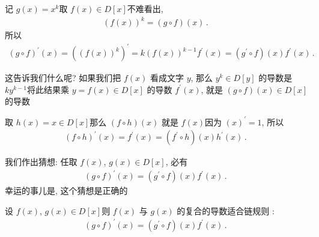 记 $g(x) = x^k$\period 取 $f(x) \in D[x]$\period 不难看出,
\begin{align*}
    (f(x))^k = (g \circ f)(x) \period
\end{align*}
所以
\begin{align*}
    (g \circ f)^{\prime}(x) = ((f(x))^k)^{\prime} = k(f(x))^{k-1} f^{\prime} (x) = (g^{\prime} \circ f)(x) f^{\prime} (x) \period
\end{align*}

这告诉我们什么呢? 如果我们把 $f(x)$ 看成文字 $y$, 那么 $y^k \in D[y]$ 的导数是 $ky^{k-1}$\period 将此结果乘 $y = f(x) \in D[x]$ 的导数 $f^{\prime} (x)$, 就是 $(g \circ f) (x) \in D[x]$ 的导数\period

取 $h(x) = x \in D[x]$\period 那么 $(f \circ h)(x)$ 就是 $f(x)$\period 因为 $(x)^{\prime} = 1$, 所以
\begin{align*}
    (f \circ h)^{\prime} (x) = f^{\prime} (x) = (f^{\prime} \circ h) (x) h^{\prime} (x) \period
\end{align*}

我们作出猜想: 任取 $f(x)$, $g(x) \in D[x]$, 必有
\begin{align*}
    (g \circ f)^{\prime} (x) = (g^{\prime} \circ f)(x) f^{\prime} (x) \period
\end{align*}
幸运的事儿是, 这个猜想是正确的\period

\begin{proposition}
    设 $f(x)$, $g(x) \in D[x]$\period 则 $f(x)$ 与 $g(x)$ 的复合的导数适合链规则 :
    \begin{align*}
        (g \circ f)^{\prime} (x) = (g^{\prime} \circ f)(x) f^{\prime} (x) \period
    \end{align*}
\end{proposition}

